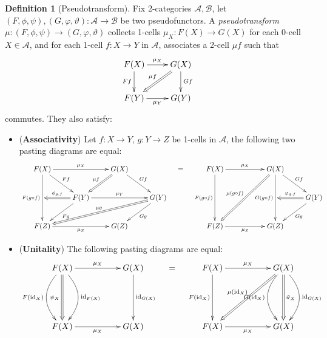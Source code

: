 \documentclass[openany, amssymb, psamsfonts]{amsart}
\theoremstyle{definition}
\newtheorem{defn}{Definition}[section]
\numberwithin{equation}{section}
\newcommand{\A}{\mathscr{A}}
\newcommand{\B}{\mathscr{B}}
\newcommand{\id}{\mathrm{id}} %
\begin{document}
\vspace{1pt}

\begin{defn}[Pseudotransform]\label{defn_pseudotransform}
    Fix 2-categories $\A,\B$, let $(F,\phi,\psi), (G,\varphi,\vartheta):\A\rightarrow\B$ be two pseudofunctors. A \emph{pseudotransform} $\mu:(F,\phi,\psi)\rightarrow (G,\varphi,\vartheta)$ collects 1-cells $\mu_X:F(X)\rightarrow G(X)$ for each 0-cell $X\in\A$, and for each 1-cell $f:X\rightarrow Y$ in $\A$, associates a 2-cell $\mu f$ such that 
    \begin{align*}
        \xymatrix{
            F(X) \ar[r]^-{\mu_X} \ar[d]_-{Ff} & G(X) \ar[d]^-{Gf} \ar@{=>}[dl]_-{\mu f}\\
            F(Y) \ar[r]_-{\mu_Y} & G(Y)
        }
    \end{align*}
    commutes. They also satisfy:
    \begin{itemize}
        \item[(i)] (\textbf{Associativity}) Let $f:X\rightarrow Y$, $g:Y\rightarrow Z$ be 1-cells in $\A$, the following two pasting diagrams are equal:
        \begin{align*}
            \xymatrix{
                F(X) \ar[dd]_-{F(g\circ f)} \ar[dr]^-{Ff} \ar[rr]^-{\mu_X} && G(X) \ar@{=>}[dl]_-{\mu f} \ar[dr]^-{Gf}\\
                & F(Y) \ar[rr]^-{\mu_Y} \ar@{=>}[l]_-{\phi_{g,f}} \ar[dl]^-{Fg} && G(Y) \ar[dl]^-{Gg} \ar@{=>}[dlll]_-{\mu g}\\
                F(Z) \ar[rr]_-{\mu_Z} && G(Z)
            } \quad = \quad \xymatrix{
                F(X) \ar[dd]_-{F(g\circ f)} \ar[rr]^-{\mu_X} && G(X) \ar[dr]^-{Gf} \ar[dd]_-{G(g\circ f)} \ar@{=>}[ddll]_-{\mu(g\circ f)}\\
                &&& G(Y) \ar[dl]^-{Gg} \ar@{=>}[l]_-{\varphi_{g,f}}\\
                F(Z) \ar[rr]_-{\mu_Z} && G(Z)
            }
        \end{align*}
        \item[(ii)] (\textbf{Unitality}) The following pasting diagrams are equal:
        \begin{align*}
            \xymatrix{
                F(X) \ar@(dl,ul)[dd]_-{F(\id_X)} \ar@(dr,ur)[dd]^-{\id_{F(X)}} \ar@{=>}[dd]_-{\psi_X} \ar[rr]^-{\mu_X} && G(X) \ar[dd]^-{\id_{G(X)}}\\
                \\
                F(X) \ar[rr]_-{\mu_X} && G(X)
            }\quad = \quad \xymatrix{
                F(X) \ar[dd]_-{F(\id_X)} \ar[rr]^-{\mu_X} && G(X) \ar@{=>}[ddll]_-{\mu(\id_X)} \ar@(dl,ul)[dd]_-{G(\id_X)} \ar@(dr,ur)[dd]^-{\id_{G(X)}} \ar@{=>}[dd]^-{\vartheta_X}\\
                \\
                F(X) \ar[rr]_-{\mu_X} && G(X)
            }
        \end{align*}
    \end{itemize}
\end{defn}
\end{document}
